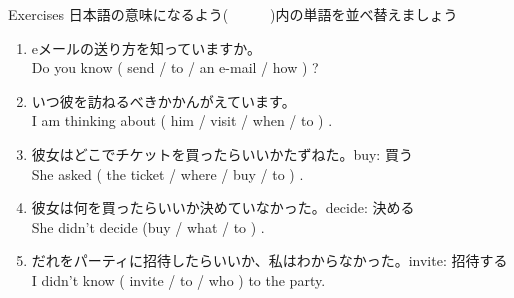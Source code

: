 \documentclass[aspectratio=169,xcolor={dvipsnames,table}]{beamer}
\begin{document}
\begin{frame}[plain]{Exercises}
日本語の意味になるよう(~~~~~~)内の単語を並べ替えましょう%
\hfill{\scriptsize {}}

 \begin{enumerate}
  \item eメールの送り方を知っていますか。\\%
	Do you know ( send / to / an e-mail / how ) ?\hfill{}
	\visible<2->{\textcolor{BurntOrange}{\bfseries how to send an e-mail}}
  \item いつ彼を訪ねるべきかかんがえています。\\
	I am thinking about ( him / visit / when / to ) .\hfill{}
	\visible<3->{\textcolor{BurntOrange}{\bfseries when to visit him}}
  \item 彼女はどこでチケットを買ったらいいかたずねた。\hfill{\scriptsize buy: 買う}\\
	She asked ( the ticket / where / buy / to  ) .\hfill{}
	\\
  \item 彼女は何を買ったらいいか決めていなかった。\hfill{\scriptsize decide: 決める}\\
	She didn't decide (buy / what / to ) .
	\hfill\visible<5->{\textcolor{BurntOrange}{\bfseries what to buy}}
  \item だれをパーティに招待したらいいか、私はわからなかった。\hfill{\scriptsize invite: 招待する}\\
	I didn't know ( invite / to / who ) to the party.\hfill{}
	\visible<6->{\textcolor{BurntOrange}{\bfseries who to invite}}
 \end{enumerate}
\end{frame}
\end{document}
